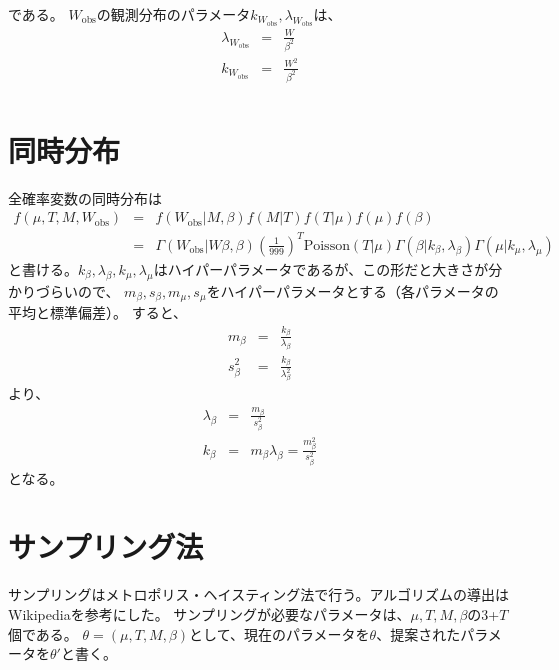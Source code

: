 \documentclass{jsarticle}
\newcommand{\numput}{T}
\newcommand{\maisu}{M}
\newcommand{\poisson}{\mathrm{Poisson}}
\newcommand{\meannumput}{\mu}
\newcommand{\weightall}{W}
\newcommand{\ampeq}{&=&}
\newcommand{\weightobs}{W_{\mathrm{obs}}}
\newcommand{\weightsd}{\beta}
\newcommand{\gammak}{k}
\newcommand{\gammal}{\lambda}
\newcommand{\parmean}{m}
\newcommand{\parsd}{s}
\begin{document}
である。 $\weightobs$の観測分布のパラメータ$\gammak_{\weightobs}, \gammal_{\weightobs}$は、
\begin{eqnarray*}
 \gammal_{\weightobs} \ampeq \frac{W}{\weightsd^{2}} \\
 \gammak_{\weightobs} \ampeq \frac{W^{2}}{\weightsd^{2}} \\
\end{eqnarray*}



\section{同時分布}
全確率変数の同時分布は
\begin{eqnarray*}
 f(\meannumput, \numput, \maisu, \weightobs) \ampeq f(\weightobs | \maisu, \weightsd)f(\maisu | \numput)f(\numput | \meannumput)f(\meannumput)f(\weightsd) \\
 \ampeq \Gamma(\weightobs | \weightall \weightsd, \weightsd) \left(\frac{1}{999}\right)^{\numput} \poisson(T | \meannumput) 
  \Gamma(\weightsd | \gammak_{\weightsd}, \gammal_{\weightsd}) \Gamma(\meannumput | \gammak_{\meannumput}, \gammal_{\meannumput})
\end{eqnarray*}
と書ける。$\gammak_{\weightsd}, \gammal_{\weightsd}, \gammak_{\meannumput}, \gammal_{\meannumput}$はハイパーパラメータであるが、この形だと大きさが分かりづらいので、
$\parmean_{\weightsd}, \parsd_{\weightsd}, \parmean_{\meannumput}, \parsd_{\meannumput}$をハイパーパラメータとする（各パラメータの平均と標準偏差）。
すると、
\begin{eqnarray*}
 \parmean_{\weightsd} \ampeq \frac{\gammak_{\weightsd}}{\gammal_{\weightsd}} \\
 \parsd_{\weightsd}^{2} \ampeq \frac{\gammak_{\weightsd}}{\gammal_{\weightsd}^{2}}
\end{eqnarray*}
より、
\begin{eqnarray*}
 \gammal_{\weightsd} \ampeq \frac{\parmean_{\weightsd}}{\parsd_{\weightsd}^{2}} \\
 \gammak_{\weightsd} \ampeq \parmean_{\weightsd} \gammal_{\weightsd} = \frac{\parmean_{\weightsd}^{2}}{\parsd_{\weightsd}^{2}}
\end{eqnarray*}
となる。

\section{サンプリング法}
サンプリングはメトロポリス・ヘイスティング法で行う。アルゴリズムの導出はWikipediaを参考にした。
サンプリングが必要なパラメータは、$\meannumput, \numput, \maisu, \weightsd$の3+$\numput$個である。
$\theta = (\meannumput, \numput, \maisu, \weightsd)$として、現在のパラメータを$\theta$、提案されたパラメータを$\theta'$と書く。
\end{document}
